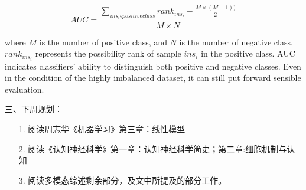 \documentclass[UTF8,10.5pt]{article} %
\begin{document}
\begin{equation}
 \label{equ:AUC}
 AUC=\frac{\sum_{{ins_{i}\epsilon positiveclass}}rank_{ins_{i}}-\frac{M \times(M+1))}{2}}{M \times N}
\end{equation}

where $M$ is the number of positive class, and $N$ is the number of negative class. $rank_{ins_{i}}$ represents the possibility rank of sample $ins_{i}$ in the positive class. AUC indicates classifiers' ability to distinguish both positive and negative classes. Even in the condition of the highly imbalanced dataset, it can still put forward sensible evaluation.


\vspace{0.5cm}
\noindent 三、下周规划：
\begin{enumerate}[labelsep = .5em, leftmargin = -18pt, itemindent = 3em]
    \item [1.] 阅读周志华《机器学习》第三章：线性模型      
    \item [2.] 阅读《认知神经科学》第一章：认知神经科学简史；第二章:细胞机制与认知
    \item [3.] 阅读多模态综述剩余部分，及文中所提及的部分工作。
\end{enumerate}


\newpage



\end{document}
